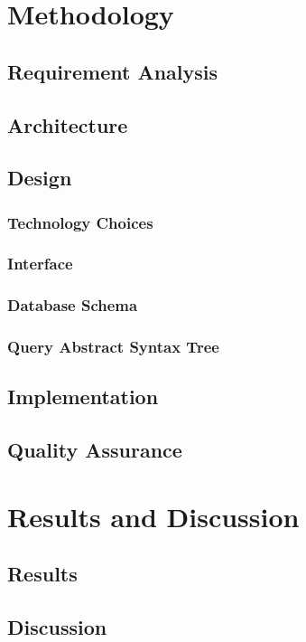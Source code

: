 \documentclass[a4paper,12pt]{book}
\begin{document}
\chapter{Methodology}
\section{Requirement Analysis}

\section{Architecture}

\section{Design}
\subsection{Technology Choices}
\subsection{Interface}
\subsection{Database Schema}
\subsection{Query Abstract Syntax Tree}

\section{Implementation}

\section{Quality Assurance}

\chapter{Results and Discussion}
\section{Results}
\section{Discussion}
\end{document}
